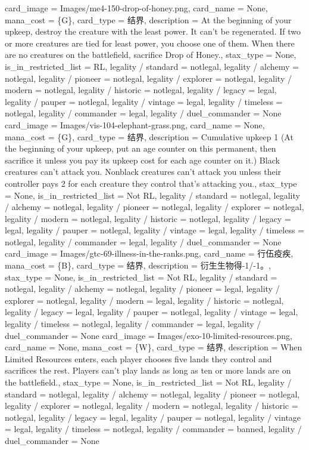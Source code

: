 \documentclass[lang = cn, color = black, 10pt]{AllThatStax}
\begin{document}
\card
{
	card_image = Images/me4-150-drop-of-honey.png,
	card_name = None,
	mana_cost = \{G\},
	card_type = 结界,
	description = At the beginning of your upkeep, destroy the creature with the least power. It can't be regenerated. If two or more creatures are tied for least power, you choose one of them.
	When there are no creatures on the battlefield, sacrifice Drop of Honey.,
	stax_type = None,
	is_in_restricted_list = RL,
	legality / standard = notlegal,
	legality / alchemy = notlegal,
	legality / pioneer = notlegal,
	legality / explorer = notlegal,
	legality / modern = notlegal,
	legality / historic = notlegal,
	legality / legacy = legal,
	legality / pauper = notlegal,
	legality / vintage = legal,
	legality / timeless = notlegal,
	legality / commander = legal,
	legality / duel_commander = None
}
\card
{
	card_image = Images/vis-104-elephant-grass.png,
	card_name = None,
	mana_cost = \{G\},
	card_type = 结界,
	description = Cumulative upkeep {1} (At the beginning of your upkeep, put an age counter on this permanent, then sacrifice it unless you pay its upkeep cost for each age counter on it.)
	Black creatures can't attack you.
	Nonblack creatures can't attack you unless their controller pays {2} for each creature they control that's attacking you.,
	stax_type = None,
	is_in_restricted_list = Not RL,
	legality / standard = notlegal,
	legality / alchemy = notlegal,
	legality / pioneer = notlegal,
	legality / explorer = notlegal,
	legality / modern = notlegal,
	legality / historic = notlegal,
	legality / legacy = legal,
	legality / pauper = notlegal,
	legality / vintage = legal,
	legality / timeless = notlegal,
	legality / commander = legal,
	legality / duel_commander = None
}
\card
{
	card_image = Images/gtc-69-illness-in-the-ranks.png,
	card_name = 行伍疫疾,
	mana_cost = \{B\},
	card_type = 结界,
	description = 衍生生物得-1/-1。,
	stax_type = None,
	is_in_restricted_list = Not RL,
	legality / standard = notlegal,
	legality / alchemy = notlegal,
	legality / pioneer = legal,
	legality / explorer = notlegal,
	legality / modern = legal,
	legality / historic = notlegal,
	legality / legacy = legal,
	legality / pauper = notlegal,
	legality / vintage = legal,
	legality / timeless = notlegal,
	legality / commander = legal,
	legality / duel_commander = None
}
\card
{
	card_image = Images/exo-10-limited-resources.png,
	card_name = None,
	mana_cost = \{W\},
	card_type = 结界,
	description = When Limited Resources enters, each player chooses five lands they control and sacrifices the rest.
	Players can't play lands as long as ten or more lands are on the battlefield.,
	stax_type = None,
	is_in_restricted_list = Not RL,
	legality / standard = notlegal,
	legality / alchemy = notlegal,
	legality / pioneer = notlegal,
	legality / explorer = notlegal,
	legality / modern = notlegal,
	legality / historic = notlegal,
	legality / legacy = legal,
	legality / pauper = notlegal,
	legality / vintage = legal,
	legality / timeless = notlegal,
	legality / commander = banned,
	legality / duel_commander = None
}
\end{document}

